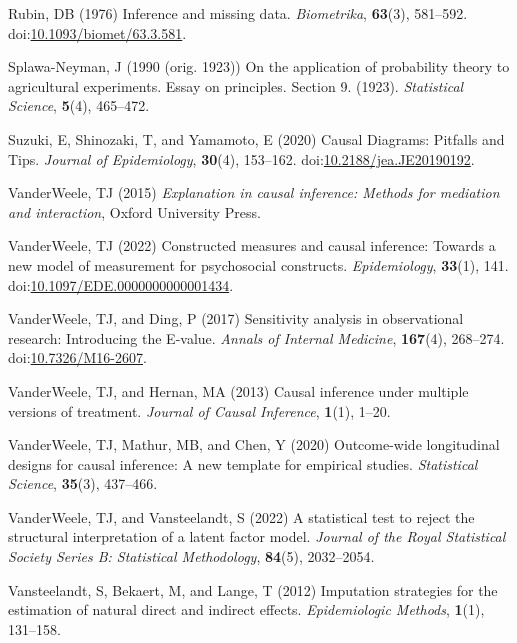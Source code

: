 \documentclass[
  singlecolumn]{article}
\newlength{\cslhangindent}
\newenvironment{CSLReferences}[2] %
 {\begin{list}{}{%
  \setlength{\itemindent}{0pt}
  \setlength{\leftmargin}{0pt}
  \setlength{\parsep}{0pt}
  \ifodd #1
   \setlength{\leftmargin}{\cslhangindent}
   \setlength{\itemindent}{-1\cslhangindent}
  \fi
  \setlength{\itemsep}{#2\baselineskip}}}
 {\end{list}}
\begin{document}
\begin{CSLReferences}{1}{0}
Rubin, DB (1976) Inference and missing data. \emph{Biometrika},
\textbf{63}(3), 581--592.
doi:\href{https://doi.org/10.1093/biomet/63.3.581}{10.1093/biomet/63.3.581}.

Splawa-Neyman, J (1990 (orig. 1923)) On the application of probability
theory to agricultural experiments. Essay on principles. Section 9.
(1923). \emph{Statistical Science}, \textbf{5}(4), 465--472.

Suzuki, E, Shinozaki, T, and Yamamoto, E (2020) Causal Diagrams:
Pitfalls and Tips. \emph{Journal of Epidemiology}, \textbf{30}(4),
153--162.
doi:\href{https://doi.org/10.2188/jea.JE20190192}{10.2188/jea.JE20190192}.

VanderWeele, TJ (2015) \emph{Explanation in causal inference: Methods
for mediation and interaction}, Oxford University Press.

VanderWeele, TJ (2022) Constructed measures and causal inference:
Towards a new model of measurement for psychosocial constructs.
\emph{Epidemiology}, \textbf{33}(1), 141.
doi:\href{https://doi.org/10.1097/EDE.0000000000001434}{10.1097/EDE.0000000000001434}.

VanderWeele, TJ, and Ding, P (2017) Sensitivity analysis in
observational research: Introducing the {E}-value. \emph{Annals of
Internal Medicine}, \textbf{167}(4), 268--274.
doi:\href{https://doi.org/10.7326/M16-2607}{10.7326/M16-2607}.

VanderWeele, TJ, and Hernan, MA (2013) Causal inference under multiple
versions of treatment. \emph{Journal of Causal Inference},
\textbf{1}(1), 1--20.

VanderWeele, TJ, Mathur, MB, and Chen, Y (2020) Outcome-wide
longitudinal designs for causal inference: A new template for empirical
studies. \emph{Statistical Science}, \textbf{35}(3), 437--466.

VanderWeele, TJ, and Vansteelandt, S (2022) A statistical test to reject
the structural interpretation of a latent factor model. \emph{Journal of
the Royal Statistical Society Series B: Statistical Methodology},
\textbf{84}(5), 2032--2054.

Vansteelandt, S, Bekaert, M, and Lange, T (2012) Imputation strategies
for the estimation of natural direct and indirect effects.
\emph{Epidemiologic Methods}, \textbf{1}(1), 131--158.


\end{CSLReferences}
\end{document}
